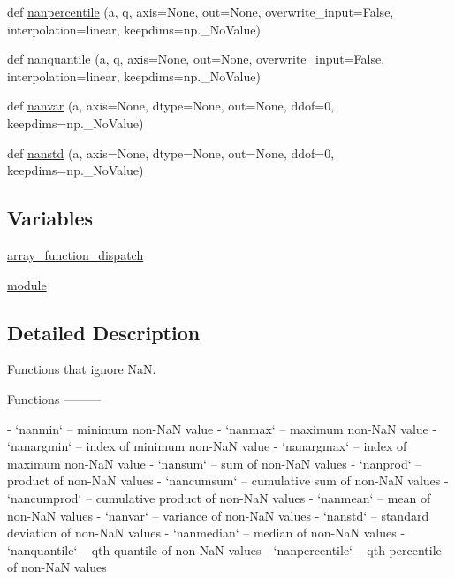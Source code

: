 \begin{DoxyCompactItemize}
def \hyperlink{namespacenumpy_1_1lib_1_1nanfunctions_a1fb5edb6795a7ac5109de2579da1dc03}{nanpercentile} (a, q, axis=None, out=None, overwrite\+\_\+input=False, interpolation=\textquotesingle{}linear\textquotesingle{}, keepdims=np.\+\_\+\+No\+Value)
\item 
def \hyperlink{namespacenumpy_1_1lib_1_1nanfunctions_a5eb8de27a8087256d8205db0e4151bd4}{nanquantile} (a, q, axis=None, out=None, overwrite\+\_\+input=False, interpolation=\textquotesingle{}linear\textquotesingle{}, keepdims=np.\+\_\+\+No\+Value)
\item 
def \hyperlink{namespacenumpy_1_1lib_1_1nanfunctions_aa74b1b732ed44e858f6610c2f8e09836}{nanvar} (a, axis=None, dtype=None, out=None, ddof=0, keepdims=np.\+\_\+\+No\+Value)
\item 
def \hyperlink{namespacenumpy_1_1lib_1_1nanfunctions_acb96436d04b671c696d194e3feb1317d}{nanstd} (a, axis=None, dtype=None, out=None, ddof=0, keepdims=np.\+\_\+\+No\+Value)
\end{DoxyCompactItemize}
\subsection*{Variables}
\begin{DoxyCompactItemize}
\item 
\hyperlink{namespacenumpy_1_1lib_1_1nanfunctions_a5d66ace42e50dfe8f961bdaad0c9ff6e}{array\+\_\+function\+\_\+dispatch}
\item 
\hyperlink{namespacenumpy_1_1lib_1_1nanfunctions_a909a2bb150c1b122fe91d94ae7774659}{module}
\end{DoxyCompactItemize}


\subsection{Detailed Description}
\begin{DoxyVerb}Functions that ignore NaN.

Functions
---------

- `nanmin` -- minimum non-NaN value
- `nanmax` -- maximum non-NaN value
- `nanargmin` -- index of minimum non-NaN value
- `nanargmax` -- index of maximum non-NaN value
- `nansum` -- sum of non-NaN values
- `nanprod` -- product of non-NaN values
- `nancumsum` -- cumulative sum of non-NaN values
- `nancumprod` -- cumulative product of non-NaN values
- `nanmean` -- mean of non-NaN values
- `nanvar` -- variance of non-NaN values
- `nanstd` -- standard deviation of non-NaN values
- `nanmedian` -- median of non-NaN values
- `nanquantile` -- qth quantile of non-NaN values
- `nanpercentile` -- qth percentile of non-NaN values\end{DoxyVerb}
 


